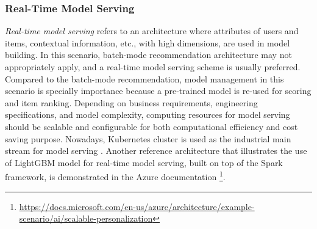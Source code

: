 \subsubsection{Real-Time Model Serving}
\textit{Real-time model serving} refers to an architecture where attributes of users and items, contextual information, etc., with high dimensions, are used in model building. In this scenario, batch-mode recommendation architecture may not appropriately apply, and a real-time model serving scheme is usually preferred. Compared to the batch-mode recommendation, model management in this scenario is specially importance because a pre-trained model is re-used for scoring and item ranking. Depending on business requirements, engineering specifications, and model complexity, computing resources for model serving should be scalable and configurable for both computational efficiency and cost saving purpose. Nowadays, Kubernetes cluster is used as the industrial main stream for model serving \cite{bernstein2014containers}. Another reference architecture that illustrates the use of LightGBM model \cite{ke2017lightgbm} for real-time model serving, built on top of the Spark framework, is demonstrated in the Azure documentation \footnote{\url{https://docs.microsoft.com/en-us/azure/architecture/example-scenario/ai/scalable-personalization}}.
